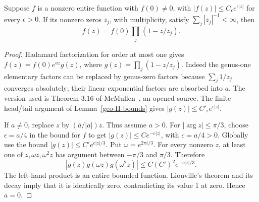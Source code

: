 \begin{lemma}
\label{geo-H-genus}
Suppose $f$ is a nonzero entire function with $f(0)\ne0$, with
$|f(z)|\leq C_\epsilon e^{\epsilon|z|}$ for every $\epsilon>0$. If its
nonzero zeros $z_j$, with multiplicity, satisfy $\sum_j|z_j|^{-1}<\infty$,
then
\[
 f(z)=f(0)\prod_j(1-z/z_j).
\]
\end{lemma}
\begin{proof}
Hadamard factorization for order at most one gives
$f(z)=f(0)e^{az}g(z)$, where $g(z)=\prod_j(1-z/z_j)$.
Indeed the genus-one elementary factors can be replaced by genus-zero factors
because $\sum_j1/z_j$ converges absolutely; their linear exponential factors
are absorbed into $a$. The version used is Theorem 3.16 of
McMullen~\cite{McMullen2025}, an opened source. The finite-head/tail argument
of Lemma~\ref{geo-H-bounds} gives $|g(z)|\leq C'_\epsilon e^{\epsilon|z|}$.

If $a\ne0$, replace $z$ by $(\overline a/|a|)z$. Thus assume $a>0$.
For $|\arg z|\leq\pi/3$, choose $\epsilon=a/4$ in the bound for $f$ to get
$|g(z)|\leq C e^{-c|z|}$, with $c=a/4>0$. Globally use the bound
$|g(z)|\leq C'e^{c|z|/3}$. Put $\omega=e^{2\pi i/3}$. For every nonzero
$z$, at least one of $z,\omega z,\omega^2z$ has argument between
$-\pi/3$ and $\pi/3$. Therefore
\[
 |g(z)g(\omega z)g(\omega^2z)|\leq C(C')^2e^{-c|z|/3}.
\]
The left-hand product is an entire bounded function. Liouville's theorem and
its decay imply that it is identically zero, contradicting its value $1$ at
zero. Hence $a=0$.
\end{proof}

